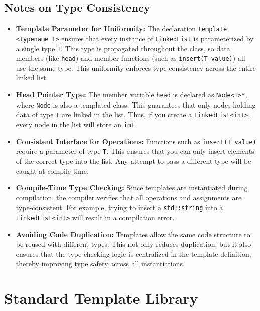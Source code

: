 \documentclass{report}
\begin{document}
\bigskip

\subsection*{Notes on Type Consistency}

\begin{itemize}
	\item \textbf{Template Parameter for Uniformity:}
	      The declaration \texttt{template <typename T>} ensures that every instance of \texttt{LinkedList} is parameterized by a single type \texttt{T}. This type is propagated throughout the class, so data members (like \texttt{head}) and member functions (such as \texttt{insert(T value)}) all use the same type. This uniformity enforces type consistency across the entire linked list.

	\item \textbf{Head Pointer Type:}
	      The member variable \texttt{head} is declared as \texttt{Node<T>*}, where \texttt{Node} is also a templated class. This guarantees that only nodes holding data of type \texttt{T} are linked in the list. Thus, if you create a \texttt{LinkedList<int>}, every node in the list will store an \texttt{int}.

	\item \textbf{Consistent Interface for Operations:}
	      Functions such as \texttt{insert(T value)} require a parameter of type \texttt{T}. This ensures that you can only insert elements of the correct type into the list. Any attempt to pass a different type will be caught at compile time.

	\item \textbf{Compile-Time Type Checking:}
	      Since templates are instantiated during compilation, the compiler verifies that all operations and assignments are type-consistent. For example, trying to insert a \texttt{std::string} into a \texttt{LinkedList<int>} will result in a compilation error.

	\item \textbf{Avoiding Code Duplication:}
	      Templates allow the same code structure to be reused with different types. This not only reduces duplication, but it also ensures that the type checking logic is centralized in the template definition, thereby improving type safety across all instantiations.
\end{itemize}

\section{Standard Template Library}
\end{document}
